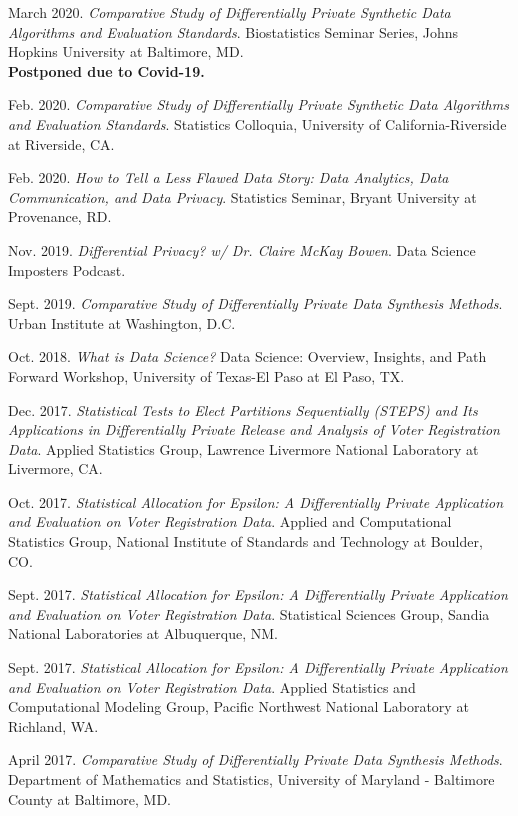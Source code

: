 \documentclass[11pt, letterpaper, roman]{moderncv} %
\begin{document}
\begin{etaremune}[topsep=0pt, itemsep=6pt, partopsep=0pt, parsep=0pt]
  \item March 2020. \textit{Comparative Study of Differentially Private Synthetic Data Algorithms and Evaluation Standards}. Biostatistics Seminar Series, Johns Hopkins University at Baltimore, MD.\\
  \textbf{Postponed due to Covid-19.}
  
  \item Feb. 2020. \textit{Comparative Study of Differentially Private Synthetic Data Algorithms and Evaluation Standards}. Statistics Colloquia, University of California-Riverside at Riverside, CA.
  
  \item Feb. 2020. \textit{How to Tell a Less Flawed Data Story: Data Analytics, Data Communication, and Data Privacy}. Statistics Seminar, Bryant University at Provenance, RD.
  
  \item Nov. 2019. \textit{Differential Privacy? w/ Dr. Claire McKay Bowen}. Data Science Imposters Podcast.
  
  \item Sept. 2019. \textit{Comparative Study of Differentially Private Data Synthesis Methods}. Urban Institute at Washington, D.C.
  
  \item Oct. 2018. \textit{What is Data Science?} Data Science: Overview, Insights, and Path Forward Workshop, University of Texas-El Paso at El Paso, TX.

  \item Dec. 2017. \textit{Statistical Tests to Elect Partitions Sequentially (STEPS) and Its Applications in Differentially Private Release and Analysis of Voter Registration Data}. Applied Statistics Group, Lawrence Livermore National Laboratory at Livermore, CA.
  
  \item Oct. 2017. \textit{Statistical Allocation for Epsilon: A Differentially Private Application and Evaluation on Voter Registration Data}. Applied and Computational Statistics Group, National Institute of Standards and Technology at Boulder, CO.
  
  \item Sept. 2017. \textit{Statistical Allocation for Epsilon: A Differentially Private Application and Evaluation on Voter Registration Data}. Statistical Sciences Group, Sandia National Laboratories at Albuquerque, NM.
  
  \item Sept. 2017. \textit{Statistical Allocation for Epsilon: A Differentially Private Application and Evaluation on Voter Registration Data}. Applied Statistics and Computational Modeling Group, Pacific Northwest National Laboratory at Richland, WA.
  
  \item April 2017. \textit{Comparative Study of Differentially Private Data Synthesis Methods}. Department of Mathematics and Statistics, University of Maryland - Baltimore County at Baltimore, MD.
\end{etaremune}
\end{document}

